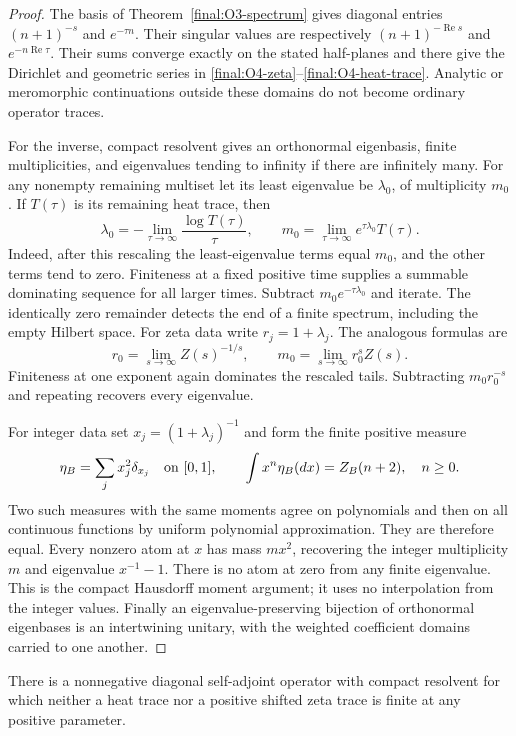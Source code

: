 \begin{proof}
The basis of Theorem~\ref{final:O3-spectrum} gives diagonal entries
$(n+1)^{-s}$ and $e^{-\tau n}$.  Their singular values are respectively
$(n+1)^{-\operatorname{Re}s}$ and $e^{-n\operatorname{Re}\tau}$.
Their sums converge exactly on the stated half-planes and there give
the Dirichlet and geometric series in
\eqref{final:O4-zeta}--\eqref{final:O4-heat-trace}.
Analytic or meromorphic continuations outside these domains do not
become ordinary operator traces.

For the inverse, compact resolvent gives an orthonormal eigenbasis,
finite multiplicities, and eigenvalues tending to infinity if there
are infinitely many.  For any nonempty remaining multiset let its
least eigenvalue be $\lambda_0$, of multiplicity $m_0$.
If $T(\tau)$ is its remaining heat trace, then
\[
 \lambda_0=-\lim_{\tau\to\infty}\frac{\log T(\tau)}{\tau},
 \qquad m_0=\lim_{\tau\to\infty}e^{\tau\lambda_0}T(\tau).
\]
Indeed, after this rescaling the least-eigenvalue terms equal $m_0$,
and the other terms tend to zero.  Finiteness at a fixed positive
time supplies a summable dominating sequence for all larger times.
Subtract $m_0e^{-\tau\lambda_0}$ and iterate.  The identically zero
remainder detects the end of a finite spectrum, including the empty
Hilbert space.
For zeta data write $r_j=1+\lambda_j$.  The analogous formulas are
\[
 r_0=\lim_{s\to\infty}Z(s)^{-1/s},\qquad
 m_0=\lim_{s\to\infty}r_0^sZ(s).
\]
Finiteness at one exponent again dominates the rescaled tails.
Subtracting $m_0r_0^{-s}$ and repeating recovers every eigenvalue.

For integer data set $x_j=(1+\lambda_j)^{-1}$ and form the finite
positive measure
\[
 \eta_B=\sum_j x_j^2\delta_{x_j}\quad\hbox{on }[0,1],
 \qquad \int x^n\eta_B(dx)=Z_B(n+2),\quad n\geq0.
\]
Two such measures with the same moments agree on polynomials and
then on all continuous functions by uniform polynomial approximation.
They are therefore equal.  Every nonzero atom at $x$ has mass
$m x^2$, recovering the integer multiplicity $m$ and eigenvalue
$x^{-1}-1$.  There is no atom at zero from any finite eigenvalue.
This is the compact Hausdorff moment argument; it uses no interpolation
from the integer values.  Finally an eigenvalue-preserving bijection
of orthonormal eigenbases is an intertwining unitary, with the
weighted coefficient domains carried to one another.
\end{proof}

\begin{proposition}
\label{final:O4-convergence-boundary}
There is a nonnegative diagonal self-adjoint operator with compact
resolvent for which neither a heat trace nor a positive shifted zeta
trace is finite at any positive parameter.
\end{proposition}

